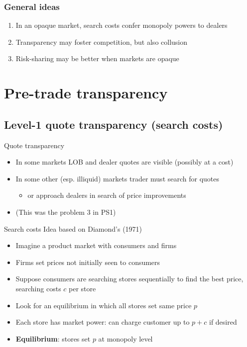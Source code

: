 \documentclass[english,10pt
,aspectratio=169
]{beamer}
\begin{document}
\begin{frame}[label=ideas]
	\frametitle{General ideas}
	\begin{enumerate}
		\item In an opaque market, search costs confer monopoly powers to dealers
		\item Transparency may foster competition, but also collusion
		\item Risk-sharing may be better when markets are opaque
	\end{enumerate}
	\hyperlink{example}{}
\end{frame}



\section{Pre-trade transparency}

\subsection{Level-1 quote transparency (search costs)}

\begin{frame}{Quote transparency}
	\begin{itemize}
		\item In some markets LOB and dealer quotes are visible (possibly at a cost)
		\item In some other (esp. illiquid) markets trader must search for quotes 
		\begin{itemize}
			\item or approach dealers in search of price improvements
		\end{itemize}
		\item (This was the problem 3 in PS1)
	\end{itemize}
\end{frame}


\begin{frame}{Search costs}
	Idea based on Diamond's (1971) 
	\begin{itemize}
		\item Imagine a product market with consumers and firms
		\item Firms set prices not initially seen to consumers
		\item Suppose consumers are searching stores sequentially to find the best price, searching costs $c$ per store
		\item Look for an equilibrium in which all stores set same price $p$
		\item Each store has market power: can charge customer up to $p+c$ if desired
		\item \textbf{Equilibrium}: stores set $p$ at monopoly level
	\end{itemize}
\end{frame}
\end{document}
